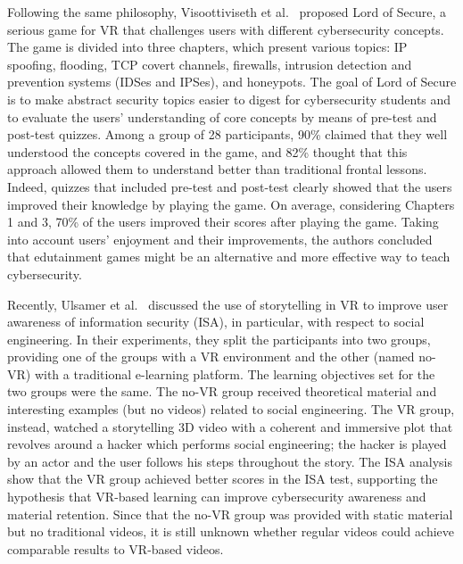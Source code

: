 \documentclass[journal]{IEEEtran}
\begin{document}
Following the same philosophy, Visoottiviseth et al.~\cite{visoottiviseth2018} proposed Lord of Secure, a serious game for VR that challenges users with different cybersecurity concepts. The game is divided into three chapters, which present various topics: IP spoofing, flooding, TCP covert channels, firewalls, intrusion detection and prevention systems (IDSes and IPSes), and honeypots. The goal of Lord of Secure is to make abstract security topics easier to digest for cybersecurity students and to evaluate the users' understanding of core concepts by means of pre-test and post-test quizzes. Among a group of 28 participants, 90\% claimed that they well understood the concepts covered in the game, and 82\% thought that this approach allowed them to understand better than traditional frontal lessons. Indeed, quizzes that included pre-test and post-test clearly showed that the users improved their knowledge by playing the game. On average, considering Chapters 1 and 3, 70\% of the users improved their scores after playing the game. Taking into account users' enjoyment and their improvements, the authors concluded that edutainment games might be an alternative and more effective way to teach cybersecurity.


Recently, Ulsamer et al.~\cite{ulsamer2021} discussed the use of storytelling in VR to improve user awareness of information security (ISA), in particular, with respect to social engineering. In their experiments, they split the participants into two groups, providing one of the groups with a VR environment and the other (named no-VR) with a traditional e-learning platform. The learning objectives set for the two groups were the same. The no-VR group received theoretical material and interesting examples (but no videos) related to social engineering. The VR group, instead, watched a storytelling 3D video with a coherent and immersive plot that revolves around a hacker which performs social engineering; the hacker is played by an actor and the user follows his steps throughout the story. The ISA analysis show that the VR group achieved better scores in the ISA test, supporting the hypothesis that VR-based learning can improve cybersecurity awareness and material retention. Since that the no-VR group was provided with static material but no traditional videos, it is still unknown whether regular videos could achieve comparable results to VR-based videos.
\end{document}
